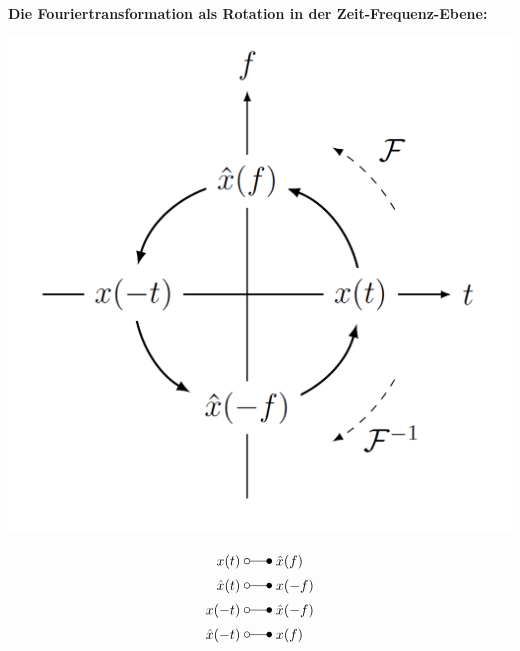 \textbf{Die Fouriertransformation als Rotation in der Zeit-Frequenz-Ebene:}
\begin{center}
    \includegraphics[width=0.6\linewidth]{img/FT_Rotation.png}
\end{center}
\begin{align*}
    x(t) \;&\laplace\; \hat{x}(f) \\
    \hat{x}(t) \;&\laplace\; x(-f) \\
    x(-t) \;&\laplace\; \hat{x}(-f) \\
    \hat{x}(-t)\;&\laplace\; x(f)
\end{align*}